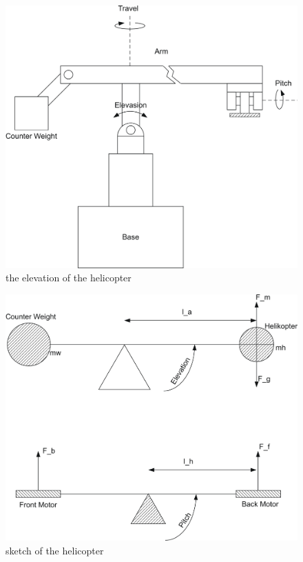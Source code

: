 \graphicspath{ {figures/} }
\begin{figure}[H]
\includegraphics[width=\textwidth]{HeliScatch1.png}
\caption{the elevation of the helicopter}
\label{fig:heli1}
\end{figure} 

\begin{figure}[H]
\includegraphics[width=\textwidth]{HeliScatch2.png}
\caption{sketch of the helicopter}
\label{fig:heli2}
\end{figure}

